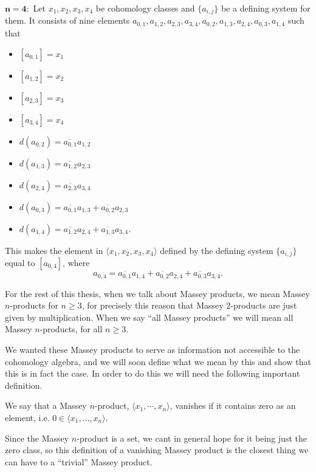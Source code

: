 $\mathbf{n=4}:$ Let $x_1, x_2, x_3, x_4$ be cohomology classes and $\{ a_{i,j} \}$ be a defining system for them. It consists of nine elements $a_{0,1}, a_{1,2}, a_{2,3}, a_{3,4}, a_{0,2}, a_{1,3}, a_{2,4}, a_{0,3}, a_{1,4}$ such that 
\begin{itemize}
    \item $[a_{0,1}] = x_1$
    \item $[a_{1,2}] = x_2$
    \item $[a_{2,3}] = x_3$
    \item $[a_{3,4}] = x_4$
    \item $d(a_{0,2}) = \overline{a_{0,1}} a_{1,2}$
    \item $d(a_{1,3}) = \overline{a_{1,2}} a_{2,3}$
    \item $d(a_{2,4}) = \overline{a_{2,3}} a_{3,4}$
    \item $d(a_{0,3}) = \overline{a_{0,1}} a_{1,3}+\overline{a_{0,2}}a_{2,3}$
    \item $d(a_{1,4}) = \overline{a_{1,2}} a_{2,4}+\overline{a_{1,3}}a_{3,4}$.
\end{itemize}
This makes the element in $\langle x_1, x_2, x_3, x_4\rangle$ defined by the defining system $\{a_{i,j}\}$ equal to $[a_{0,4}]$, where
\begin{equation*}
    a_{0,4} = \overline{a_{0,1}}a_{1,4} + \overline{a_{0,2}}a_{2,4} + \overline{a_{0,3}}a_{3,4}.
\end{equation*}

For the rest of this thesis, when we talk about Massey products, we mean Massey $n$-products for $n\geq 3$, for precisely this reason that Massey $2$-products are just given by multiplication. When we say ``all Massey products'' we will mean all Massey $n$-products, for all $n\geq 3$. 

We wanted these Massey products to serve as information not accessible to the cohomology algebra, and we will soon define what we mean by this and show that this is in fact the case. In order to do this we will need the following important definition. 

\begin{definition}
\label{def:vanishing_massey}
We say that a Massey $n$-product, $\langle x_1, \cdots, x_n\rangle$, vanishes if it contains zero as an element, i.e. $0\in \langle x_1, \ldots, x_n\rangle$. 
\end{definition}

Since the Massey $n$-product is a set, we cant in general hope for it being just the zero class, so this definition of a vanishing Massey product is the closest thing we can have to a ``trivial'' Massey product. 

